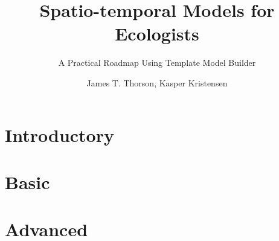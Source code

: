 \documentclass[krantz2]{krantz} %
\begin{document}
\frontmatter



\title{Spatio-temporal Models for Ecologists} %
\subtitle{A Practical Roadmap Using Template Model Builder}


\author{James T. Thorson, Kasper Kristensen}%



\maketitle




\locpage

%
\cleardoublepage
\setcounter{page}{7} %
\tableofcontents
%

%
\listoffigures
\listoftables
%
%


\mainmatter %

\part{Introductory}



\part{Basic}






\part{Advanced}





\end{document}

